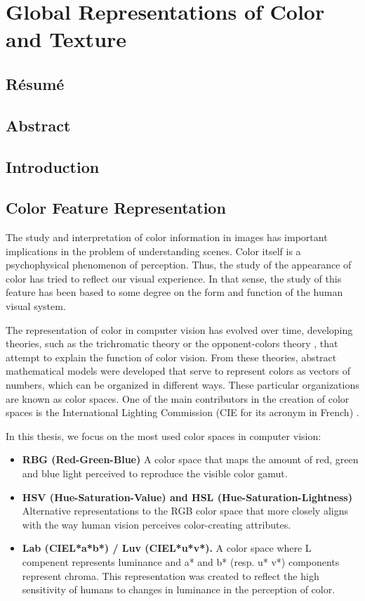 \chapter{Global Representations of Color and Texture } \label{ch:color_texure_representations}

\section*{Résumé}
\noindent 

\section*{Abstract}
\noindent 

\section{Introduction}

\section{Color Feature Representation}
The study and interpretation of color information in images has important implications in the problem of understanding scenes. Color itself is a psychophysical phenomenon of perception. Thus, the study of the appearance of color has tried to reflect our visual experience. In that sense, the study of this feature has been based to some degree on the form and function of the human visual system.

The representation of color in computer vision has evolved over time, developing theories, such as the trichromatic theory or the opponent-colors theory \citep{Fairchild:Book:2005}, that attempt to explain the function of color vision. From these theories, abstract mathematical models were developed that serve to represent colors as vectors of numbers, which can be organized in different ways. These particular organizations are known as color spaces. One of the main contributors in the creation of color spaces is the International Lighting Commission (CIE for its acronym in French) \citep{Wright:BookCh2:2007}.

In this thesis, we focus on the most used color spaces in computer vision:
\begin{itemize}
	\item \textbf{RBG (Red-Green-Blue)} A color space that maps the amount of red, green and blue light perceived to reproduce the visible color gamut.
	\item \textbf{HSV (Hue-Saturation-Value) and HSL (Hue-Saturation-Lightness)} Alternative representations to the RGB color space that more closely aligns with the way human vision perceives color-creating attributes.
	\item \textbf{Lab (CIEL*a*b*) / Luv (CIEL*u*v*).} A color space where L compenent represents luminance and a* and b* (resp. u* v*) components represent chroma. This representation was created to reflect the high sensitivity of humans to changes in luminance in the perception of color.
\end{itemize}


